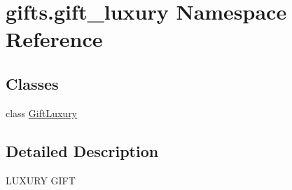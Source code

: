 \hypertarget{namespacegifts_1_1gift__luxury}{}\section{gifts.\+gift\+\_\+luxury Namespace Reference}
\label{namespacegifts_1_1gift__luxury}
\subsection*{Classes}
\begin{DoxyCompactItemize}
\item 
class \hyperlink{classgifts_1_1gift__luxury_1_1_gift_luxury}{Gift\+Luxury}
\end{DoxyCompactItemize}


\subsection{Detailed Description}
\begin{DoxyVerb}LUXURY GIFT\end{DoxyVerb}
 